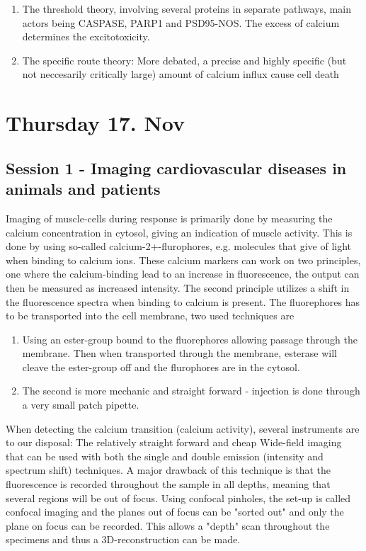 \documentclass[12p]{article}
\begin{document}
\begin{enumerate}
\item
The threshold theory, involving several proteins in separate pathways, main actors being CASPASE, PARP1 and PSD95-NOS. The excess of calcium determines the excitotoxicity.
\item
The specific route theory: More debated, a precise and highly specific (but not neccesarily critically large) amount of calcium influx cause cell death
\end{enumerate}

\section*{Thursday 17. Nov}

\subsection*{Session 1 - Imaging cardiovascular diseases in animals and patients}

Imaging of muscle-cells during response is primarily done by measuring the calcium concentration in cytosol, giving an indication of muscle activity.
This is done by using so-called calcium-2+-flurophores, e.g. molecules that give of light when binding to calcium ions.
These calcium markers can work on two principles, one where the calcium-binding lead to an increase in fluorescence, the output can then be measured as increased intensity.
The second principle utilizes a shift in the fluorescence spectra when binding to calcium is present.
The fluorephores has to be transported into the cell membrane, two used techniques are 

\begin{enumerate}
\item
Using an ester-group bound to the fluorephores allowing passage through the membrane.
Then when transported through the membrane, esterase will cleave the ester-group off and the flurophores are in the cytosol.
\item
The second is more mechanic and straight forward - injection is done through a very small patch pipette.
\end{enumerate}

When detecting the calcium transition (calcium activity), several instruments are to our disposal: 
The relatively straight forward and cheap Wide-field imaging that can be used with both the single and double emission (intensity and spectrum shift) techniques. 
A major drawback of this technique is that the fluorescence is recorded throughout the sample in all depths, meaning that several regions will be out of focus.
Using confocal pinholes, the set-up is called confocal imaging and the planes out of focus can be "sorted out" and only the plane on focus can be recorded.
This allows a "depth" scan throughout the specimens and thus a 3D-reconstruction can be made.
\end{document}
